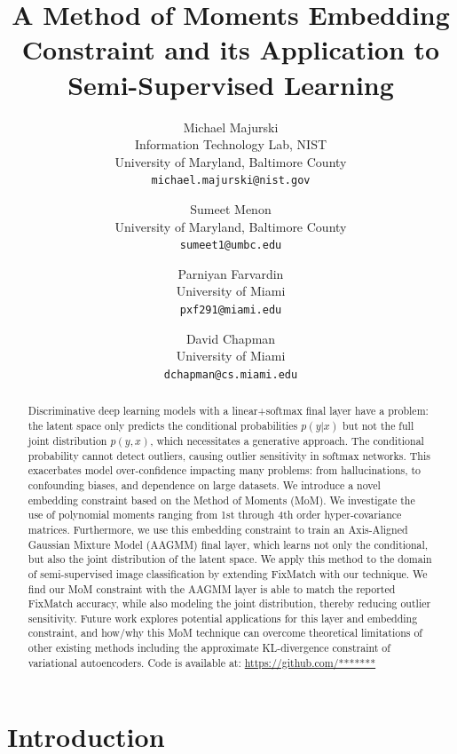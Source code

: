 \documentclass[10pt,twocolumn,letterpaper]{article}
\title{A Method of Moments Embedding Constraint and its Application to Semi-Supervised Learning}
\author{Michael Majurski\\
	Information Technology Lab, NIST\\
	University of Maryland, Baltimore County\\
	{\tt\small michael.majurski@nist.gov}
\and
Sumeet Menon\\
University of Maryland, Baltimore County\\
{\tt\small sumeet1@umbc.edu}
\and
Parniyan Farvardin\\
University of Miami\\
{\tt\small pxf291@miami.edu}
\and
David Chapman\\
University of Miami\\
{\tt\small dchapman@cs.miami.edu}
}
\begin{document}
\maketitle


\begin{abstract}
Discriminative deep learning models with a linear+softmax final layer have a problem: the latent space only predicts the conditional probabilities $p(y|x)$ but not the full joint distribution $p(y,x)$, which necessitates a generative approach.
The conditional probability cannot detect outliers, causing outlier sensitivity in softmax networks.
This exacerbates model over-confidence impacting many problems: from hallucinations, to confounding biases, and dependence on large datasets.
We introduce a novel embedding constraint based on the Method of Moments (MoM).
We investigate the use of polynomial moments ranging from 1st through 4th order hyper-covariance matrices.
Furthermore, we use this embedding constraint to train an Axis-Aligned Gaussian Mixture Model (AAGMM) final layer, which learns not only the conditional, but also the joint distribution of the latent space.
We apply this method to the domain of semi-supervised image classification by extending FixMatch with our technique.
We find our MoM constraint with the AAGMM layer is able to match the reported FixMatch accuracy, while also modeling the joint distribution, thereby reducing outlier sensitivity.
Future work explores potential applications for this layer and embedding constraint, and how/why this MoM technique can overcome theoretical limitations of other existing methods including the approximate KL-divergence constraint of variational autoencoders.
Code is available at: \url{https://github.com/*******} %
\end{abstract}


\section{Introduction}
\end{document}

